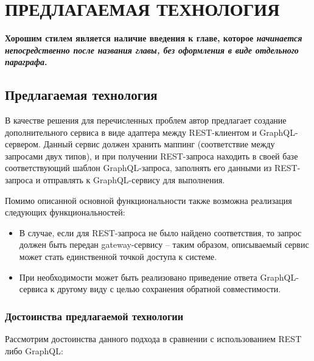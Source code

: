 

\chapter{ПРЕДЛАГАЕМАЯ ТЕХНОЛОГИЯ} \label{ch:ch2}

\textbf{Хорошим стилем является наличие введения к главе, которое \textit{начинается непосредственно после названия главы, без оформления в виде отдельного параграфа}.}


\section{Предлагаемая технология}\label{sec:proposed-technology}

В качестве решения для перечисленных проблем автор предлагает создание дополнительного сервиса в виде адаптера между REST-клиентом и GraphQL-сервером.
Данный сервис должен хранить маппинг (соответствие между запросами двух типов), и при получении REST-запроса находить в своей базе соответствующий шаблон GraphQL-запроса, заполнять его данными из REST-запроса и отправлять к GraphQL-сервису для выполнения.

Помимо описанной основной функциональности также возможна реализация следующих функциональностей:

\begin{itemize}
    \item В случае, если для REST-запроса не было найдено соответствия, то запрос должен быть передан gateway-сервису – таким образом, описываемый сервис может стать единственной точкой доступа к системе.
    \item При необходимости может быть реализовано приведение ответа GraphQL-сервиса к другому виду с целью сохранения обратной совместимости.
\end{itemize}

\subsection{Достоинства предлагаемой технологии}\label{subsec:proposed-technology-advantages}

Рассмотрим достоинства данного подхода в сравнении с использованием REST либо GraphQL:

